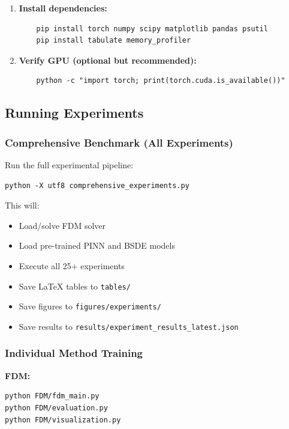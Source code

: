 \documentclass[12pt,a4paper]{article}
\begin{document}
\begin{appendices}
\begin{enumerate}
    \item \textbf{Install dependencies:}
    \begin{verbatim}
    pip install torch numpy scipy matplotlib pandas psutil
    pip install tabulate memory_profiler
    \end{verbatim}
    
    \item \textbf{Verify GPU (optional but recommended):}
    \begin{verbatim}
    python -c "import torch; print(torch.cuda.is_available())"
    \end{verbatim}
\end{enumerate}

\subsection{Running Experiments}

\subsubsection{Comprehensive Benchmark (All Experiments)}

Run the full experimental pipeline:

\begin{verbatim}
python -X utf8 comprehensive_experiments.py
\end{verbatim}

This will:
\begin{itemize}
    \item Load/solve FDM solver
    \item Load pre-trained PINN and BSDE models
    \item Execute all 25+ experiments
    \item Save LaTeX tables to \texttt{tables/}
    \item Save figures to \texttt{figures/experiments/}
    \item Save results to \texttt{results/experiment\_results\_latest.json}
\end{itemize}

\subsubsection{Individual Method Training}

\textbf{FDM:}
\begin{verbatim}
python FDM/fdm_main.py
python FDM/evaluation.py
python FDM/visualization.py
\end{verbatim}


\end{appendices}
\end{document}
